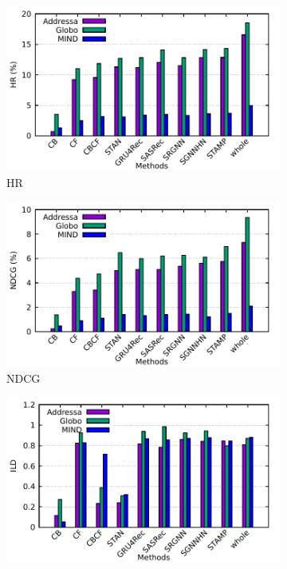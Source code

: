 \begin{figure}[th]
\begin{subfigure}[b]{0.48\textwidth}
\centering
\includegraphics[width=\columnwidth]{fig/hr.pdf}
\caption{HR}
\label{fig:hr}
\end{subfigure}
\hfill
\begin{subfigure}[b]{0.48\textwidth}
\centering
\includegraphics[width=\columnwidth]{fig/ndcg.pdf}
\caption{NDCG}
\label{fig:ndcg}
\end{subfigure}
\begin{subfigure}[b]{0.48\textwidth}
\centering
\includegraphics[width=\columnwidth]{fig/ild.pdf}

\end{subfigure}
\end{figure}
